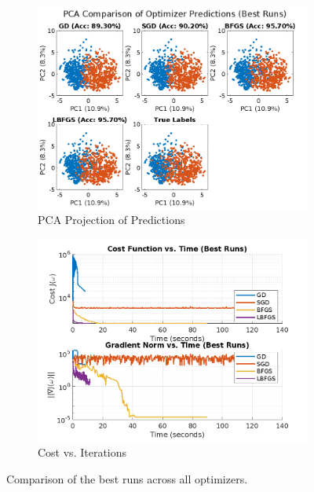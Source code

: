 \documentclass{article}
\begin{document}
\begin{figure}[H]
  \centering
  \begin{subfigure}[b]{0.45\textwidth}
    \includegraphics[width=\textwidth]{images/pca_predictions_comparison_Best_Runs.png}
    \caption{PCA Projection of Predictions}
    \label{fig:pca_best_runs}
  \end{subfigure}
  \begin{subfigure}[b]{0.45\textwidth}
    \includegraphics[width=\textwidth]{images/convergence_comparison_Best_Runs.png}
    \caption{Cost vs. Iterations}
    \label{fig:convergence_best_runs}
  \end{subfigure}
  \caption{Comparison of the best runs across all optimizers.}
  \label{fig:best_runs}
\end{figure}
\end{document}
